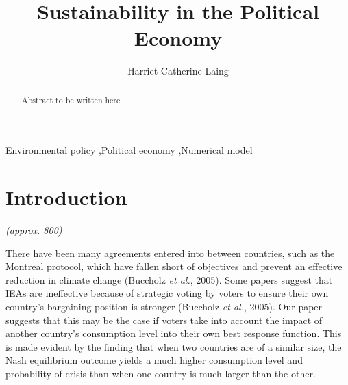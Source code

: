 \documentclass[11pt,preprint, authoryear]{elsarticle}
\numberwithin{equation}{section}
\numberwithin{figure}{section}
\numberwithin{table}{section}
\begin{document}
\begin{frontmatter}  %

\title{Sustainability in the Political Economy}





\author[Add1]{Harriet Catherine Laing}





\address[Add1]{University of Stellenbosch, South Africa}


\begin{abstract}
\small{
Abstract to be written here.
}
\end{abstract}

\vspace{1cm}


\begin{keyword}
\footnotesize{
Environmental policy \sep Political economy \sep Numerical model \\
\vspace{0.3cm}
}
\end{keyword}



\vspace{0.5cm}

\end{frontmatter}



\pagestyle{fancy}
\chead{}
\rhead{}
\lfoot{}
\lhead{}
\cfoot{}


\headsep 35pt %




\hypertarget{introduction}{%
\section{Introduction}\label{introduction}}

\emph{(approx. 800)}

There have been many agreements entered into between countries, such as
the Montreal protocol, which have fallen short of objectives and prevent
an effective reduction in climate change (Buccholz \emph{et al.}, 2005).
Some papers suggest that IEAs are ineffective because of strategic
voting by voters to ensure their own country's bargaining position is
stronger (Buccholz \emph{et al.}, 2005). Our paper suggests that this
may be the case if voters take into account the impact of another
country's consumption level into their own best response function. This
is made evident by the finding that when two countries are of a similar
size, the Nash equilibrium outcome yields a much higher consumption
level and probability of crisis than when one country is much larger
than the other.
\end{document}
